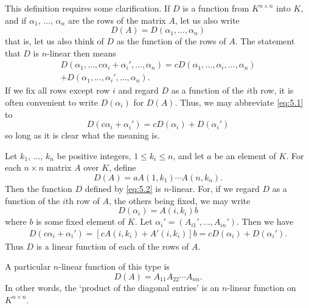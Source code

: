This definition requires some clarification. If \(D\) is a function from \(K^{n\times n}\) into \(K\), and if \(\alpha_1\), \(\ldots\), \(\alpha_n\) are the rows of the matrix \(A\), let us also write
\begin{equation*}
    D\left(A\right)=D\left(\alpha_1,\ldots,\alpha_n\right)
\end{equation*}
that is, let us also think of \(D\) as the function of the rows of \(A\). The statement that \(D\) is \(n\)-linear then means
\begin{multline}
    D\left(\alpha_1,\ldots,c\alpha_i+\alpha_i',\ldots,\alpha_n\right)=cD\left(\alpha_1,\ldots,\alpha_i,\ldots,\alpha_n\right)\\
    +D\left(\alpha_1,\ldots,\alpha_i',\ldots,\alpha_n\right).\label{eq:5.1}
\end{multline}
If we fix all rows except row \(i\) and regard \(D\) as a function of the \(i\)th row, it is often convenient to write \(D\left(\alpha_i\right)\) for \(D\left(A\right)\). Thus, we may abbreviate \eqref{eq:5.1} to
\begin{equation*}
    D\left(c\alpha_i+\alpha_i'\right)=cD\left(\alpha_i\right)+D\left(\alpha_i'\right)
\end{equation*}
so long as it is clear what the meaning is.

\begin{example}\label{example:5.1}
    Let \(k_1\), \(\ldots\), \(k_n\) be positive integers, \(1\leqslant k_i\leqslant n\), and let \(a\) be an element of \(K\). For each \(n\times n\) matrix \(A\) over \(K\), define
    \begin{equation}
        D\left(A\right)=aA\left(1,k_1\right)\cdots A\left(n,k_n\right).\label{eq:5.2}
    \end{equation}
    Then the function \(D\) defined by \eqref{eq:5.2} is \(n\)-linear. For, if we regard \(D\) as a function of the \(i\)th row of \(A\), the others being fixed, we may write
    \begin{equation*}
        D\left(\alpha_i\right)=A\left(i,k_i\right)b
    \end{equation*}
    where \(b\) is some fixed element of \(K\). Let \(\alpha_i'=\left(A_{i1}',\ldots,A_{in}'\right)\). Then we have
    \begin{align*}
        D\left(c\alpha_i+\alpha_{i}'\right)=\left[cA\left(i,k_i\right)+A'\left(i,k_i\right)\right]b=cD\left(\alpha_i\right)+D\left(\alpha_i'\right).
    \end{align*}
    Thus \(D\) is a linear function of each of the rows of \(A\).

    A particular \(n\)-linear function of this type is
    \begin{equation*}
        D\left(A\right)=A_{11}A_{22}\cdots A_{nn}.
    \end{equation*}
    In other words, the `product of the diagonal entries' is an \(n\)-linear function on \(K^{n\times n}\).
\end{example}

